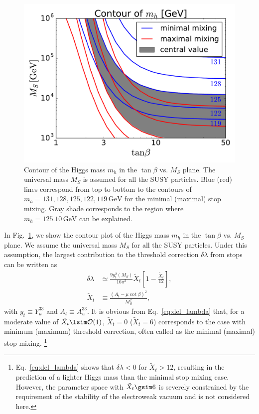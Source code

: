 \documentclass[12pt,twoside,book]{article}
\begin{document}
\begin{figure}[t]
  \centering
  \includegraphics[width=0.6\hsize]{higgs_mass.pdf}
  \caption{
    Contour of the Higgs mass $m_h$ in the $\tan\beta$ vs. $M_S$ plane.
    The universal mass $M_S$ is assumed for all the SUSY particles.
    Blue (red) lines correspond from top to bottom to the contours of $m_h = 131, 128, 125, 122, 119\, \mathrm{GeV}$ for the minimal (maximal) stop mixing.
    Gray shade corresponds to the region where $m_h = 125.10\,\mathrm{GeV}$ can be explained.
  }
  \label{fig:higgs_mass}
\end{figure}

In Fig.~\ref{fig:higgs_mass}, we show the contour plot of the Higgs mass $m_h$ in the $\tan\beta$ vs. $M_S$ plane.
We assume the universal mass $M_S$ for all the SUSY particles.
Under this assumption, the largest contribution to the threshold correction $\delta \lambda$ from stops can be written as
\begin{align}
  \delta \lambda &\simeq \frac{9 y_t^2 (M_S)}{16 \pi^2} \tilde{X}_t \left[ 1-\frac{\tilde{X}_t}{12} \right], \label{eq:del_lambda}\\
  \tilde{X}_t &\equiv \frac{(A_t - \mu \cot \beta)^2}{M_S^2},
\end{align}
with $y_t \equiv Y_u^{33}$ and $A_t \equiv A_u^{33}$.
It is obvious from Eq.~\eqref{eq:del_lambda} that, for a moderate value of $\tilde{X}_t \lsim \mathcal{O}(1)$, $\tilde{X}_t = 0$ ($\tilde{X}_t = 6$) corresponds to the case with minimum (maximum) threshold correction, often called as the minimal (maximal) stop mixing.
\footnote{
  Eq.~\eqref{eq:del_lambda} shows that $\delta \lambda < 0$ for $\tilde{X}_t > 12$, resulting in the prediction of a lighter Higgs mass than the minimal stop mixing case.
  However, the parameter space with $\tilde{X}_t \gsim 6$ is severely constrained by the requirement of the stability of the electroweak vacuum  and is not considered here.
}
\end{document}
